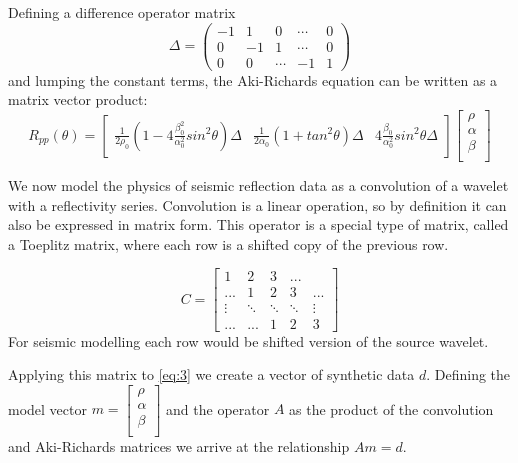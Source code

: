 \documentclass{article} %
\begin{document}
Defining a difference operator matrix
\begin{equation}\label{eq:2}
\Delta = 
\begin{pmatrix}
-1 & 1 & 0  &\cdots & 0 \\
0 & -1 & 1 & \cdots & 0 \\
0 & 0 & \cdots & -1 & 1
\end{pmatrix}
\end{equation}
and lumping the constant terms, the Aki-Richards
equation can be written as a matrix vector product:
\begin{equation}\label{eq:3}
R_{pp}(\theta) = 
\begin{bmatrix}
\frac{1}{2\rho_0}(1-4\frac{\beta_0^2}{\alpha_0^2}sin^2\theta)\Delta &  \frac{1}{2\alpha_0}(1+tan^2\theta)\Delta & 4\frac{\beta_0}
{\alpha_0^2}sin^2\theta\Delta
\end{bmatrix}
\begin{bmatrix}
\rho \\
\alpha \\
\beta \\
\end{bmatrix}
\end{equation}

We now model the physics of seismic reflection data as a convolution of a wavelet with a
reflectivity series. Convolution is a linear operation, so by definition it
can also be expressed in matrix form. This operator is a special type of matrix,
called a Toeplitz matrix, where each row is a shifted copy of the previous row.

\begin{equation}\label{eq:4}
C = 
\begin{bmatrix}
1 & 2 & 3 & ...  \\
... & 1 & 2 & 3 & ... \\
\vdots & \ddots & \ddots & \ddots &  \vdots \\
... & ... & 1 & 2 & 3
\end{bmatrix}
\end{equation}
For seismic modelling each row would be shifted version of the source
wavelet.

Applying this matrix to \ref{eq:3} we create a vector of
synthetic data $d$. Defining the model vector $m=\begin{bmatrix}
\rho \\
\alpha \\
\beta \\
\end{bmatrix}
$
and the operator $A$ as the product of the convolution and Aki-Richards matrices
we arrive at the relationship $Am=d$.
\end{document}
